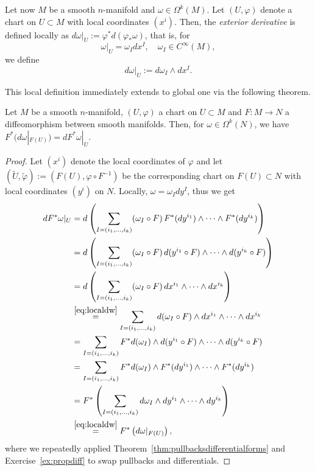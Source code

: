\begin{definition}
	Let now $M$ be a smooth $n$-manifold and $\omega\in\Omega^k(M)$.
	Let $(U,\varphi)$ denote a chart on $U\subset M$ with local coordinates $(x^i)$.
	Then, the \emph{exterior derivative} is defined locally as $d\omega|_U := \varphi^*d(\varphi_* \omega)$, that is, for
	\begin{equation}
		\omega|_U = \omega_I dx^I, \quad \omega_I \in C^\infty(M),
	\end{equation}
	we define
	\begin{equation}\label{eq:localdw}
		d\omega|_U := d\omega_I \wedge dx^I.
	\end{equation}
\end{definition}

This local definition immediately extends to global one via the following theorem.

\begin{theorem}\label{thm:differentialpushforward}
	Let $M$ be a smooth $n$-manifold, $(U,\varphi)$ a chart on $U\subset M$ and $F:M\to N$ a diffeomorphism between smooth manifolds.
	Then, for $\omega\in\Omega^k(N)$, we have $F^*(d\omega|_{F(U)}) = dF^*\omega|_U$.
\end{theorem}
\begin{proof}
	Let $(x^i)$ denote the local coordinates of $\varphi$ and let
	$(\widetilde U, \widetilde\varphi) := (F(U), \varphi\circ F^{-1})$ be the corresponding chart on $F(U)\subset N$ with local coordinates $(y^i)$ on $N$.
	Locally, $\omega = \omega_I dy^I$, thus we get
	\begin{align}
		d F^* \omega|_U
		 & = d\left( \sum_{I=(i_1,\ldots,i_k)}(\omega_I\circ F)\, F^*(dy^{i_1})\wedge\cdots\wedge F^*(dy^{i_k})\right)          \\
		 & = d\left( \sum_{I=(i_1,\ldots,i_k)}(\omega_I\circ F)\, d(y^{i_1} \circ F)\wedge\cdots\wedge d(y^{i_k}\circ F)\right) \\
		 & = d\left( \sum_{I=(i_1,\ldots,i_k)}(\omega_I\circ F)\, dx^{i_1}\wedge\cdots\wedge dx^{i_k}\right)                    \\
		 & \stackrel{\eqref{eq:localdw}}{=} \sum_{I=(i_1,\ldots,i_k)} d(\omega_I\circ F)\wedge dx^{i_1}\wedge\cdots\wedge dx^{i_k}                           \\
		 & = \sum_{I=(i_1,\ldots,i_k)} F^* d(\omega_I)\wedge d(y^{i_1}\circ F)\wedge\cdots\wedge d(y^{i_k}\circ F)            \\
		 & = \sum_{I=(i_1,\ldots,i_k)} F^* d(\omega_I)\wedge F^*(dy^{i_1})\wedge\cdots\wedge F^*(dy^{i_k})                    \\
		 & = F^*\left( \sum_{I=(i_1,\ldots,i_k)} d\omega_I \wedge dy^{i_1}\wedge\cdots\wedge dy^{i_k} \right)            \\
		 & \stackrel{\eqref{eq:localdw}}{=} F^*\left(d\omega|_{F(U)}\right),
	\end{align}
	where we repeatedly applied Theorem~\ref{thm:pullbacksdifferentialforms} and Exercise~\ref{ex:propdiff} to swap pullbacks and differentials.
\end{proof}


